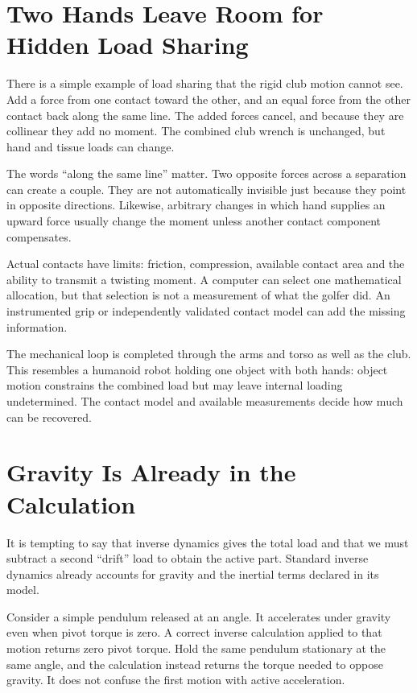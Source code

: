 \documentclass[11pt,a4paper]{article}
\begin{document}
\section{Two Hands Leave Room for Hidden Load Sharing}
There is a simple example of load sharing that the rigid club motion cannot see. Add a force from one contact toward the other, and an equal force from the other contact back along the same line. The added forces cancel, and because they are collinear they add no moment. The combined club wrench is unchanged, but hand and tissue loads can change.

The words ``along the same line'' matter. Two opposite forces across a separation can create a couple. They are not automatically invisible just because they point in opposite directions. Likewise, arbitrary changes in which hand supplies an upward force usually change the moment unless another contact component compensates.

Actual contacts have limits: friction, compression, available contact area and the ability to transmit a twisting moment. A computer can select one mathematical allocation, but that selection is not a measurement of what the golfer did. An instrumented grip or independently validated contact model can add the missing information.

The mechanical loop is completed through the arms and torso as well as the club. This resembles a humanoid robot holding one object with both hands: object motion constrains the combined load but may leave internal loading undetermined. The contact model and available measurements decide how much can be recovered.

\section{Gravity Is Already in the Calculation}
It is tempting to say that inverse dynamics gives the total load and that we must subtract a second ``drift'' load to obtain the active part. Standard inverse dynamics already accounts for gravity and the inertial terms declared in its model.

Consider a simple pendulum released at an angle. It accelerates under gravity even when pivot torque is zero. A correct inverse calculation applied to that motion returns zero pivot torque. Hold the same pendulum stationary at the same angle, and the calculation instead returns the torque needed to oppose gravity. It does not confuse the first motion with active acceleration.
\end{document}
